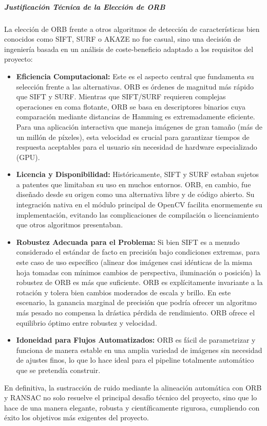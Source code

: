 
\subparagraph{\textbf{Justificación Técnica de la Elección de ORB}}

La elección de ORB frente a otros algoritmos de detección de características bien conocidos como SIFT, SURF o AKAZE no fue casual, sino una decisión de ingeniería basada en un análisis de coste-beneficio adaptado a los requisitos del proyecto:

\begin{itemize}
    \item \textbf{Eficiencia Computacional:} Este es el aspecto central que fundamenta su selección frente a las alternativas. ORB es órdenes de magnitud más rápido que SIFT y SURF. Mientras que SIFT/SURF requieren complejas operaciones en coma flotante, ORB se basa en descriptores binarios cuya comparación mediante distancias de Hamming es extremadamente eficiente. Para una aplicación interactiva que maneja imágenes de gran tamaño (más de un millón de píxeles), esta velocidad es crucial para garantizar tiempos de respuesta aceptables para el usuario sin necesidad de hardware especializado (GPU).
    \item \textbf{Licencia y Disponibilidad:} Históricamente, SIFT y SURF estaban sujetos a patentes que limitaban su uso en muchos entornos. ORB, en cambio, fue diseñado desde su origen como una alternativa libre y de código abierto. Su integración nativa en el módulo principal de OpenCV facilita enormemente su implementación, evitando las complicaciones de compilación o licenciamiento que otros algoritmos presentaban.
    \item \textbf{Robustez Adecuada para el Problema:} Si bien SIFT es a menudo considerado el estándar de facto en precisión bajo condiciones extremas, para este caso de uso específico (alinear dos imágenes casi idénticas de la misma hoja tomadas con mínimos cambios de perspectiva, iluminación o posición) la robustez de ORB es más que suficiente. ORB es explícitamente invariante a la rotación y tolera bien cambios moderados de escala y brillo. En este escenario, la ganancia marginal de precisión que podría ofrecer un algoritmo más pesado no compensa la drástica pérdida de rendimiento. ORB ofrece el equilibrio óptimo entre robustez y velocidad.
    \item \textbf{Idoneidad para Flujos Automatizados:} ORB es fácil de parametrizar y funciona de manera estable en una amplia variedad de imágenes sin necesidad de ajustes finos, lo que lo hace ideal para el pipeline totalmente automático que se pretendía construir.
\end{itemize}
En definitiva, la sustracción de ruido mediante la alineación automática con ORB y RANSAC no solo resuelve el principal desafío técnico del proyecto, sino que lo hace de una manera elegante, robusta y científicamente rigurosa, cumpliendo con éxito los objetivos más exigentes del proyecto.

 